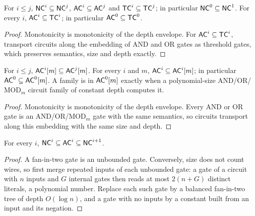 \begin{proposition}
  \label{prop:circuits-depth-classes}
  \leanok
  For $i \le j$, $\mathsf{NC}^i \subseteq \mathsf{NC}^j$, $\mathsf{AC}^i \subseteq \mathsf{AC}^j$
  and $\mathsf{TC}^i \subseteq \mathsf{TC}^j$; in particular
  $\mathsf{NC}^0 \subseteq \mathsf{NC}^1$. For every $i$,
  $\mathsf{AC}^i \subseteq \mathsf{TC}^i$; in particular
  $\mathsf{AC}^0 \subseteq \mathsf{TC}^0$.
\end{proposition}
\begin{proof}
  \leanok
  Monotonicity is monotonicity of the depth envelope. For
  $\mathsf{AC}^i \subseteq \mathsf{TC}^i$, transport circuits along the embedding of
  AND and OR gates as threshold gates, which preserves semantics, size and
  depth exactly.
\end{proof}

\begin{proposition}
  \label{prop:circuits-ac-subset-acc}
  \leanok
  For $i \le j$, $\mathsf{AC}^i[m] \subseteq \mathsf{AC}^j[m]$. For every $i$ and $m$,
  $\mathsf{AC}^i \subseteq \mathsf{AC}^i[m]$; in particular
  $\mathsf{AC}^0 \subseteq \mathsf{AC}^0[m]$. A family is in $\mathsf{AC}^0[m]$ exactly
  when a polynomial-size AND/OR/$\mathrm{MOD}_m$ circuit family of constant
  depth computes it.
\end{proposition}
\begin{proof}
  \leanok
  Monotonicity is monotonicity of the depth envelope. Every AND or OR gate is
  an AND/OR/$\mathrm{MOD}_m$ gate with the same semantics, so circuits transport
  along this embedding with the same size and depth.
\end{proof}

\begin{proposition}[Interleaving]
  \label{prop:circuits-nc-ac-interleave}
  For every $i$, $\mathsf{NC}^i \subseteq \mathsf{AC}^i \subseteq \mathsf{NC}^{i+1}$.
\end{proposition}
\begin{proof}
  A fan-in-two gate is an unbounded gate. Conversely, size does not count
  wires, so first merge repeated inputs of each unbounded gate: a gate of a
  circuit with $n$ inputs and $G$ internal gates then reads at most
  $2(n + G)$ distinct literals, a polynomial number. Replace each such gate by
  a balanced fan-in-two tree of depth $O(\log n)$, and a gate with no inputs
  by a constant built from an input and its negation.
\end{proof}

